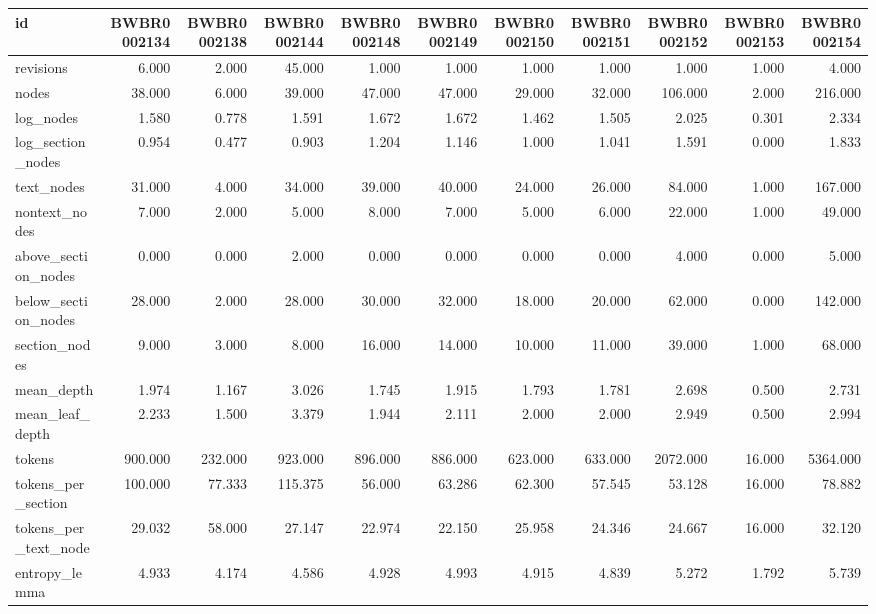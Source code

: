 \begin{tabular}{lrrrrrrrrrr}
\toprule
id & BWBR0002134 & BWBR0002138 & BWBR0002144 & BWBR0002148 & BWBR0002149 & BWBR0002150 & BWBR0002151 & BWBR0002152 & BWBR0002153 & BWBR0002154 \\
\midrule
revisions & 6.000 & 2.000 & 45.000 & 1.000 & 1.000 & 1.000 & 1.000 & 1.000 & 1.000 & 4.000 \\
\cline{1-11}
nodes & 38.000 & 6.000 & 39.000 & 47.000 & 47.000 & 29.000 & 32.000 & 106.000 & 2.000 & 216.000 \\
\cline{1-11}
log\_nodes & 1.580 & 0.778 & 1.591 & 1.672 & 1.672 & 1.462 & 1.505 & 2.025 & 0.301 & 2.334 \\
\cline{1-11}
log\_section\_nodes & 0.954 & 0.477 & 0.903 & 1.204 & 1.146 & 1.000 & 1.041 & 1.591 & 0.000 & 1.833 \\
\cline{1-11}
text\_nodes & 31.000 & 4.000 & 34.000 & 39.000 & 40.000 & 24.000 & 26.000 & 84.000 & 1.000 & 167.000 \\
\cline{1-11}
nontext\_nodes & 7.000 & 2.000 & 5.000 & 8.000 & 7.000 & 5.000 & 6.000 & 22.000 & 1.000 & 49.000 \\
\cline{1-11}
above\_section\_nodes & 0.000 & 0.000 & 2.000 & 0.000 & 0.000 & 0.000 & 0.000 & 4.000 & 0.000 & 5.000 \\
\cline{1-11}
below\_section\_nodes & 28.000 & 2.000 & 28.000 & 30.000 & 32.000 & 18.000 & 20.000 & 62.000 & 0.000 & 142.000 \\
\cline{1-11}
section\_nodes & 9.000 & 3.000 & 8.000 & 16.000 & 14.000 & 10.000 & 11.000 & 39.000 & 1.000 & 68.000 \\
\cline{1-11}
mean\_depth & 1.974 & 1.167 & 3.026 & 1.745 & 1.915 & 1.793 & 1.781 & 2.698 & 0.500 & 2.731 \\
\cline{1-11}
mean\_leaf\_depth & 2.233 & 1.500 & 3.379 & 1.944 & 2.111 & 2.000 & 2.000 & 2.949 & 0.500 & 2.994 \\
\cline{1-11}
tokens & 900.000 & 232.000 & 923.000 & 896.000 & 886.000 & 623.000 & 633.000 & 2072.000 & 16.000 & 5364.000 \\
\cline{1-11}
tokens\_per\_section & 100.000 & 77.333 & 115.375 & 56.000 & 63.286 & 62.300 & 57.545 & 53.128 & 16.000 & 78.882 \\
\cline{1-11}
tokens\_per\_text\_node & 29.032 & 58.000 & 27.147 & 22.974 & 22.150 & 25.958 & 24.346 & 24.667 & 16.000 & 32.120 \\
\cline{1-11}
entropy\_lemma & 4.933 & 4.174 & 4.586 & 4.928 & 4.993 & 4.915 & 4.839 & 5.272 & 1.792 & 5.739 \\

\end{tabular}
